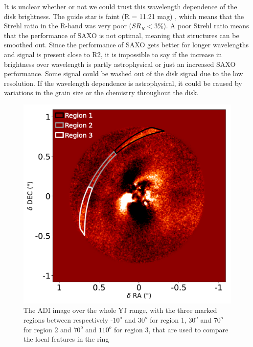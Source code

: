 \documentclass[twoside,single,12pt]{lion-msc}
\begin{document}
It is unclear whether or not we could trust this wavelength dependence of the disk brightness. The guide star is faint (R = 11.21 mag) \citep{Makarov2007}, which means that the Strehl ratio in the R-band was very poor ($SR_R < 3$\%\citep{DeBoer2016}). A poor Strehl ratio means that the performance of SAXO is not optimal, meaning that structures can be smoothed out. Since the performance of SAXO gets better for longer wavelengths and signal is present close to R2, it is impossible to say if the increase in brightness over wavelength is partly astrophysical or just an increased SAXO performance. Some signal could be washed out of the disk signal due to the low resolution. If the wavelength dependence is astrophysical, it could be caused by variations in the grain size or the chemistry throughout the disk. %
\bigskip

\begin{figure}
\vspace{-2mm}
\centering
\includegraphics[width=0.9\linewidth]{ADIregions}
\caption{The ADI image over the whole YJ range, with the three marked regions between respectively -$10^o$ and $30^o$ for region 1, $30^o$ and $70^o$ for region 2 and $70^o$ and $110^o$ for region 3, that are used to compare the local features in the ring}
\label{fig:regions}
\vspace{-9mm}
\end{figure}
\end{document}
